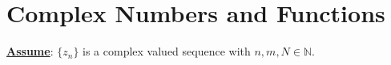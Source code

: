 \chapter{Complex Numbers and Functions}
\underline{\textbf{Assume}}: $\{ {z}_{n} \}$ is a complex valued sequence with $n,m, N \in \mathbb{N}$.



















